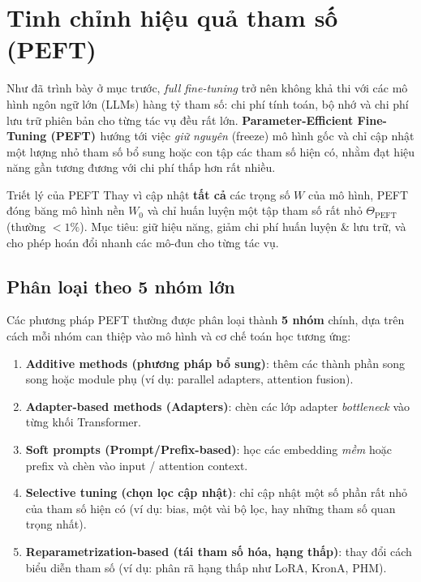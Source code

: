
\section{Tinh chỉnh hiệu quả tham số (PEFT)}
\label{sec:peft}

Như đã trình bày ở mục trước, \textit{full fine-tuning} trở nên không khả thi với các mô hình ngôn ngữ lớn (LLMs) hàng tỷ tham số: chi phí tính toán, bộ nhớ và chi phí lưu trữ phiên bản cho từng tác vụ đều rất lớn.
\textbf{Parameter-Efficient Fine-Tuning (PEFT) \cite{houlsby2019parameter, hu2021lora, lester2021power, zaken2021bitfit}} hướng tới việc \emph{giữ nguyên} (freeze) mô hình gốc và chỉ cập nhật một lượng nhỏ tham số bổ sung hoặc con tập các tham số hiện có, nhằm đạt hiệu năng gần tương đương với chi phí thấp hơn rất nhiều.

\begin{keyidea}{Triết lý của PEFT}
	Thay vì cập nhật \textbf{tất cả} các trọng số $W$ của mô hình, PEFT đóng băng mô hình nền $W_0$ và chỉ huấn luyện một tập tham số rất nhỏ $\Theta_{\mathrm{PEFT}}$ (thường $<1\%$). Mục tiêu: giữ hiệu năng, giảm chi phí huấn luyện \& lưu trữ, và cho phép hoán đổi nhanh các mô-đun cho từng tác vụ.
\end{keyidea}

\subsection{Phân loại theo 5 nhóm lớn}
\label{ssec:peft_taxonomy}
Các phương pháp PEFT thường được phân loại thành \textbf{5 nhóm}\cite{he2022towards, hu2023llmpeft, dettmers2023qlora} chính, dựa trên cách mỗi nhóm can thiệp vào mô hình và cơ chế toán học tương ứng:

\begin{enumerate}
	\item \textbf{Additive methods (phương pháp bổ sung)}: thêm các thành phần song song hoặc module phụ (ví dụ: parallel adapters, attention fusion).
	\item \textbf{Adapter-based methods (Adapters)}: chèn các lớp adapter \emph{bottleneck} vào từng khối Transformer.
	\item \textbf{Soft prompts (Prompt/Prefix-based)}: học các embedding \emph{mềm} hoặc prefix và chèn vào input / attention context.
	\item \textbf{Selective tuning (chọn lọc cập nhật)}: chỉ cập nhật một số phần rất nhỏ của tham số hiện có (ví dụ: bias, một vài bộ lọc, hay những tham số quan trọng nhất).
	\item \textbf{Reparametrization-based (tái tham số hóa, hạng thấp)}: thay đổi cách biểu diễn tham số (ví dụ: phân rã hạng thấp như LoRA, KronA, PHM).
\end{enumerate}

